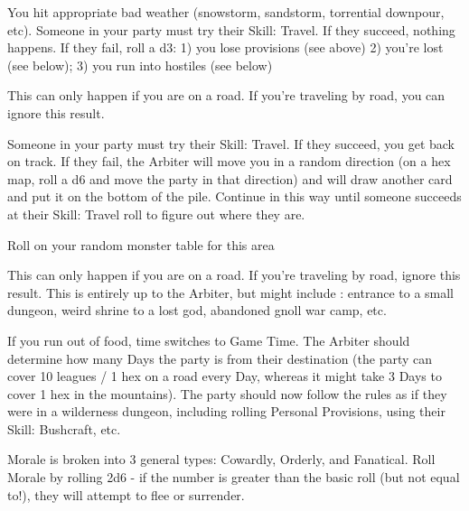 {\begin{multicols}{2}
  You hit appropriate bad weather (snowstorm, sandstorm, torrential downpour, etc).  Someone in your party must try their Skill: Travel.  If they succeed, nothing happens.  If they fail, roll a d3:  1) you lose provisions (see above) 2) you're lost (see below); 3) you run into hostiles (see below)



  This can only happen if you are  on a road. If you're traveling by road, you can ignore this result.

  Someone in your party must try their Skill: Travel.  If they succeed, you get back on track.  If they fail, the Arbiter will move you in a random direction (on a hex map, roll a d6 and move the party in that direction) and will draw another card and put it on the bottom of the pile. Continue in this way until someone succeeds at their Skill: Travel roll to figure out where they are.



  Roll on your random monster table for this area


  This can only happen if you are  on a road. If you're traveling by road, ignore this result.  This is entirely up to the Arbiter, but might include : entrance to a small dungeon, weird shrine to a lost god, abandoned gnoll war camp, etc.



  If you run out of food, time switches to Game Time.  The Arbiter should determine how many Days the party is from their destination (the party can cover 10 leagues / 1 hex on a road every Day, whereas it might take 3 Days to cover 1 hex in the mountains).  The party should now follow the rules as if they were in a wilderness dungeon, including rolling Personal Provisions, using their Skill: Bushcraft, etc. 


  \newpage




Morale is broken into 3 general types:  Cowardly, Orderly, and Fanatical.  Roll Morale by rolling 2d6 - if the number is greater than the basic roll (but not equal to!), they will attempt to flee or surrender.


\end{multicols}}
